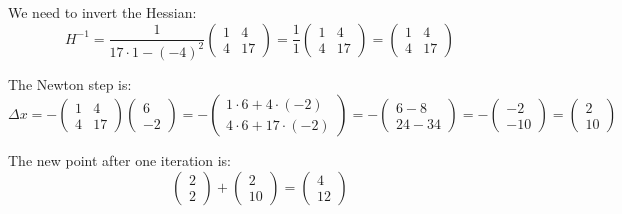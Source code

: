 \documentclass[12pt]{article}
\begin{document}
We need to invert the Hessian:
\[
H^{-1} = \frac{1}{17 \cdot 1 - (-4)^2} \begin{pmatrix}
1 & 4 \\
4 & 17
\end{pmatrix}
= \frac{1}{1} \begin{pmatrix}
1 & 4 \\
4 & 17
\end{pmatrix}
= \begin{pmatrix}
1 & 4 \\
4 & 17
\end{pmatrix}
\]

The Newton step is:
\[
\Delta x = - \begin{pmatrix}
1 & 4 \\
4 & 17
\end{pmatrix} \begin{pmatrix}
6 \\
-2
\end{pmatrix}
= - \begin{pmatrix}
1 \cdot 6 + 4 \cdot (-2) \\
4 \cdot 6 + 17 \cdot (-2)
\end{pmatrix}
= - \begin{pmatrix}
6 - 8 \\
24 - 34
\end{pmatrix}
= - \begin{pmatrix}
-2 \\
-10
\end{pmatrix}
= \begin{pmatrix}
2 \\
10
\end{pmatrix}
\]

The new point after one iteration is:
\[
\begin{pmatrix}
2 \\
2
\end{pmatrix}
+ \begin{pmatrix}
2 \\
10
\end{pmatrix}
= \begin{pmatrix}
4 \\
12
\end{pmatrix}
\]
\end{document}
